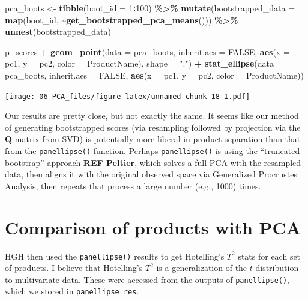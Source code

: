 \documentclass[
]{book}
\newenvironment{Shaded}{\begin{snugshade}}{\end{snugshade}}
\newcommand{\AttributeTok}[1]{\textcolor[rgb]{0.13,0.29,0.53}{#1}}
\newcommand{\ConstantTok}[1]{\textcolor[rgb]{0.56,0.35,0.01}{#1}}
\newcommand{\DecValTok}[1]{\textcolor[rgb]{0.00,0.00,0.81}{#1}}
\newcommand{\FunctionTok}[1]{\textcolor[rgb]{0.13,0.29,0.53}{\textbf{#1}}}
\newcommand{\NormalTok}[1]{#1}
\newcommand{\OtherTok}[1]{\textcolor[rgb]{0.56,0.35,0.01}{#1}}
\newcommand{\SpecialCharTok}[1]{\textcolor[rgb]{0.81,0.36,0.00}{\textbf{#1}}}
\newcommand{\StringTok}[1]{\textcolor[rgb]{0.31,0.60,0.02}{#1}}
\begin{document}
\begin{Shaded}
\begin{Highlighting}[]
\NormalTok{pca\_boots }\OtherTok{\textless{}{-}} 
  \FunctionTok{tibble}\NormalTok{(}\AttributeTok{boot\_id =} \DecValTok{1}\SpecialCharTok{:}\DecValTok{100}\NormalTok{) }\SpecialCharTok{\%\textgreater{}\%}
  \FunctionTok{mutate}\NormalTok{(}\AttributeTok{bootstrapped\_data =} \FunctionTok{map}\NormalTok{(boot\_id, }\SpecialCharTok{\textasciitilde{}}\FunctionTok{get\_bootstrapped\_pca\_means}\NormalTok{())) }\SpecialCharTok{\%\textgreater{}\%}
  \FunctionTok{unnest}\NormalTok{(bootstrapped\_data)}

\NormalTok{p\_scores }\SpecialCharTok{+}
  \FunctionTok{geom\_point}\NormalTok{(}\AttributeTok{data =}\NormalTok{ pca\_boots, }
             \AttributeTok{inherit.aes =} \ConstantTok{FALSE}\NormalTok{,}
             \FunctionTok{aes}\NormalTok{(}\AttributeTok{x =}\NormalTok{ pc1, }\AttributeTok{y =}\NormalTok{ pc2, }\AttributeTok{color =}\NormalTok{ ProductName), }\AttributeTok{shape =} \StringTok{"."}\NormalTok{) }\SpecialCharTok{+}
  \FunctionTok{stat\_ellipse}\NormalTok{(}\AttributeTok{data =}\NormalTok{ pca\_boots, }\AttributeTok{inherit.aes =} \ConstantTok{FALSE}\NormalTok{,}
               \FunctionTok{aes}\NormalTok{(}\AttributeTok{x =}\NormalTok{ pc1, }\AttributeTok{y =}\NormalTok{ pc2, }\AttributeTok{color =}\NormalTok{ ProductName))}
\end{Highlighting}
\end{Shaded}

\texttt{[image: 06-PCA\_files/figure-latex/unnamed-chunk-18-1.pdf]}

Our results are pretty close, but not exactly the same. It seems like our method of generating bootstrapped scores (via resampling followed by projection via the \(\mathbf Q\) matrix from SVD) is potentially more liberal in product separation than that from the \texttt{panellipse()} function. Perhaps \texttt{panellipse()} is using the ``truncated bootstrap'' approach \textbf{REF Peltier}, which solves a full PCA with the resampled data, then aligns it with the original observed space via Generalized Procrustes Analysis, then repeats that process a large number (e.g., 1000) times..

\section{Comparison of products with PCA}\label{comparison-of-products-with-pca}

HGH then used the \texttt{panellipse()} results to get Hotelling's \(T^2\) stats for each set of products. I believe that Hotelling's \(T^2\) is a generalization of the \(t\)-distribution to multivariate data. These were accessed from the outputs of \texttt{panellipse()}, which we stored in \texttt{panellipse\_res}.
\end{document}
